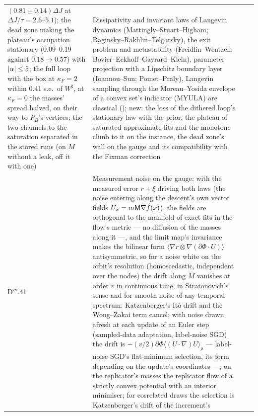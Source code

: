 {\begin{longtable}{@{}>{\raggedright\arraybackslash}p{}>{\raggedright\arraybackslash}p{}%
>{\raggedright\arraybackslash}p{}>{\raggedright\arraybackslash}p{}@{}}
$(0.81\pm0.14)\Delta J$ at $\Delta J/\tau = 2.6$--$5.1$); the dead zone making the plateau's occupation stationary
(0.09--0.19 against $0.18\to0.57$) with $\lvert \alpha\rvert\le5$; the full loop with the box at $\kappa_F = 2$ within 0.41
s.e.\ of $W^\sharp$, at $\kappa_F = 0$ the masses' spread halved, on their way to $P_B$'s vertices; the two channels to
the saturation separated in the stored runs (on $M$ without a leak, off it with one)
& Dissipativity and invariant laws of Langevin dynamics (Mattingly--Stuart--Higham; Raginsky--Rakhlin--Telgarsky), the
exit problem and metastability (Freidlin--Wentzell; Bovier--Eckhoff--Gayrard--Klein), parameter projection with a
Lipschitz boundary layer (Ioannou--Sun; Pomet--Praly), Langevin sampling through the Moreau--Yosida envelope of a convex
set's indicator (MYULA) are classical (\cite{S67}); new: the loss of the dithered loop's stationary law with the prior,
the plateau of saturated approximate fits and the monotone climb to it on the instance, the dead zone's wall on the
gauge and its compatibility with the Fixman correction\\
\addlinespace[0.5pt]
D$'''$.41 & Measurement noise on the gauge: with the measured error $r + \xi$ driving both laws (the noise entering
along the descent's own vector fields $U_x = m\mathsf M\nabla\hat f(x)$), the fields are orthogonal to the manifold of
exact fits in the flow's metric --- no diffusion of the masses along it ---, and the limit map's invariance makes the
bilinear form $\langle\nabla r\otimes\nabla(\partial\Phi\cdot U)\rangle$ antisymmetric, so for a noise white on the
orbit's resolution (homoscedastic, independent over the nodes) the drift along $M$ vanishes at order $v$ in continuous
time, in Stratonovich's sense and for smooth noise of any temporal spectrum: Katzenberger's It\^o drift and the
Wong--Zakai term cancel; with noise drawn afresh at each update of an Euler step (sampled-data adaptation, label-noise
SGD) the drift is $-(v/2)\partial\Phi\langle(U\cdot\nabla)U\rangle_\rho$ --- label-noise SGD's flat-minimum selection,
its form depending on the update's coordinates ---, on the replicator's masses the replicator flow of a strictly convex
potential with an interior minimiser; for correlated draws the selection is Katzenberger's drift of the increment's

\end{longtable}}
